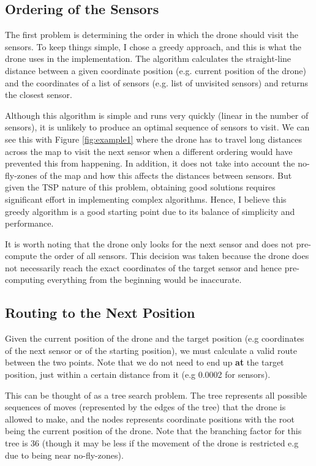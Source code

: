 \documentclass[11pt]{article}
\begin{document}
\subsection{Ordering of the Sensors}
The first problem is determining the order in which the drone should visit the sensors. To keep things simple, I chose a greedy approach, and this is what the drone uses in the implementation. The algorithm calculates the straight-line distance between a given coordinate position (e.g. current position of the drone) and the coordinates of a list of sensors (e.g. list of unvisited sensors) and returns the closest sensor.

Although this algorithm is simple and runs very quickly (linear in the number of sensors), it is unlikely to produce an optimal sequence of sensors to visit. We can see this with Figure \ref{fig:example1} where the drone has to travel long distances across the map to visit the next sensor when a different ordering would have prevented this from happening. In addition, it does not take into account the no-fly-zones of the map and how this affects the distances between sensors. But given the TSP nature of this problem, obtaining good solutions requires significant effort in implementing complex algorithms. Hence, I believe this greedy algorithm is a good starting point due to its balance of simplicity and performance.

It is worth noting that the drone only looks for the next sensor and does not pre-compute the order of all sensors. This decision was taken because the drone does not necessarily reach the exact coordinates of the target sensor and hence pre-computing everything from the beginning would be inaccurate.

\subsection{Routing to the Next Position}
Given the current position of the drone and the target position (e.g coordinates of the next sensor or of the starting position), we must calculate a valid route between the two points. Note that we do not need to end up \textbf{at} the target position, just within a certain distance from it (e.g 0.0002 for sensors).

This can be thought of as a tree search problem. The tree represents all possible sequences of moves (represented by the edges of the tree) that the drone is allowed to make, and the nodes represents coordinate positions with the root being the current position of the drone. Note that the branching factor for this tree is 36 (though it may be less if the movement of the drone is restricted e.g due to being near no-fly-zones).
\end{document}
